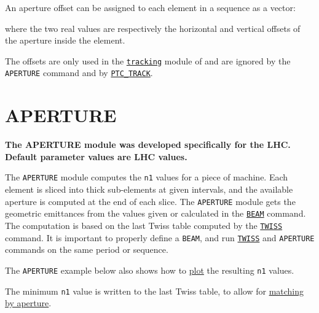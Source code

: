 An aperture offset can be assigned to each element in a \madx sequence as a vector: 

where the two real values are respectively the horizontal and vertical
offsets of the aperture inside the element. 

The offsets are only used in the \hyperref[chap:thintrack]{\tt tracking} 
module of \madx and are ignored by the {\tt APERTURE} command and by 
\hyperref[sec:ptc-track]{\tt PTC\_TRACK}.


\section{APERTURE}
\label{sec:aperture}
{\bf The APERTURE module was developed specifically for the LHC.\\ 
Default parameter values are LHC values.} 

The {\tt APERTURE} module computes the {\tt n1} values for a piece of machine. 
Each element is sliced into thick sub-elements at given intervals, and
the available aperture is computed at the end of each slice. 
The {\tt APERTURE} module gets the geometric emittances from the values given 
or calculated in the \hyperref[chap:beam]{\tt BEAM} command. 
The computation is based on the last Twiss table computed by the 
\hyperref[chap:twiss]{\tt TWISS} command. 
It is important to properly define a {\tt BEAM}, and run 
\hyperref[chap:twiss]{\tt TWISS} and \texttt{APERTURE} commands 
on the same period or sequence.

The {\tt APERTURE} example below also shows how to \hyperref[chap:plot]{plot} 
the resulting {\tt n1} values.

The minimum {\tt n1} value is written to the last Twiss table, to
allow for \hyperref[chap:match]{matching by aperture}.


